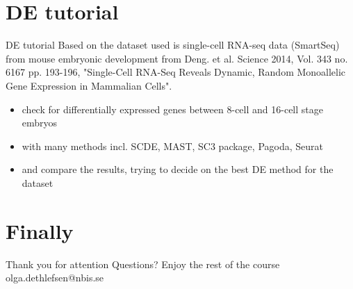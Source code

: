 \documentclass{beamer}\usepackage[]{graphicx}\usepackage[]{color}
\begin{document}
\section{DE tutorial}
\begin{frame}
\begin{center}
\insertsection
\end{center}
\end{frame}

\begin{frame}
\begin{block}{DE tutorial}
Based on the dataset used is single-cell RNA-seq data (SmartSeq) from mouse embryonic development from Deng. et al. Science 2014, Vol. 343 no. 6167 pp. 193-196, "Single-Cell RNA-Seq Reveals Dynamic, Random Monoallelic Gene Expression in Mammalian Cells".
\begin{itemize}
\item check for differentially expressed genes between 8-cell and 16-cell stage embryos
\item with many methods incl. SCDE, MAST, SC3 package, Pagoda, Seurat
\item and compare the results, trying to decide on the best DE method for the dataset
\end{itemize}
\end{block}
\end{frame}

\section{Finally}
\begin{frame}
\begin{center}
Thank you for attention
\newline
\newline
Questions?
\newline
\newline
Enjoy the rest of the course
\newline
\newline
olga.dethlefsen@nbis.se
\end{center}
\end{frame}
\end{document}
